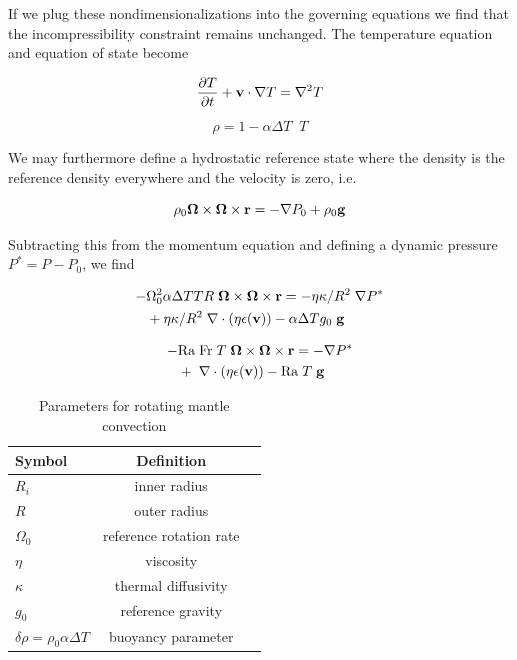 \documentclass[extra,mreferee]{gji}
\begin{document}
If we plug these nondimensionalizations into the governing equations we find that the incompressibility constraint remains unchanged.  The temperature equation and equation of state become

\begin{equation}
\frac{\partial T}{\partial t} + {\bf v} \cdot \nabla T = \nabla^2 T
\end{equation}

\begin{equation}
\rho = 1 - \alpha \Delta T \;\;  T
\end{equation}

We may furthermore define a hydrostatic reference state where the density is the reference density everywhere and the velocity is zero, i.e.

\begin{equation}
 \rho_0{\bf \Omega \times \Omega \times r}= - \nabla P_0 + \rho_0 {\bf g}
\end{equation}

Subtracting this from the momentum equation and defining a dynamic pressure $P^* = P - P_0$, we find

\begin{equation}
\begin{aligned}
 - & \Omega_0^2  \alpha  \Delta T T R \; {\bf \Omega \times \Omega \times r} = - \eta \kappa / R^2 \; \nabla P^* \\ 
&+ \eta \kappa / R^2 \; \nabla \cdot \left( \eta \epsilon ({\bf v}) \right) - \alpha \Delta T g_0 \; {\bf g}
\end{aligned}
\end{equation}

\begin{equation}
\begin{aligned}
 - & \mathrm{Ra \; Fr}\; T \; {\bf \Omega \times \Omega \times r} = - \nabla P^* \\ 
&+ \; \nabla \cdot \left( \eta \epsilon ({\bf v}) \right) - \mathrm{Ra} \; T \; {\bf g}
\end{aligned}
\end{equation}

  
\fi

\begin{table}
\centering
\caption{Parameters for rotating mantle convection}
\label{parameters}
\begin{tabular}{@{}lcc}
Symbol & Definition\\
\hline
$R_i$ & inner radius \\
$R$ & outer radius \\
$\Omega_0$ & reference rotation rate \\
$\eta$ & viscosity \\
$\kappa$ & thermal diffusivity \\
$g_0$ & reference gravity \\
$\delta \rho = \rho_0 \alpha \Delta T$ & buoyancy parameter \\ 
\end{tabular}
\end{table}
\end{document}
